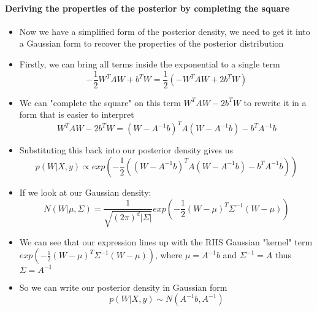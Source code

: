 \documentclass[12pt]{article}
\begin{document}
\paragraph{Deriving the properties of the posterior by completing the square}
\begin{itemize}
     \item Now we have a simplified form of the posterior density, we need to get it into a Gaussian form to recover the properties of the posterior distribution
    \item Firstly, we can bring all terms inside the exponential to a single term
\begin{equation}
    -\frac{1}{2}W^TAW + b^TW = \frac{1}{2}\left(-W^TAW + 2b^TW\right)
\end{equation}
    \item We can "complete the square" on this term $W^TAW - 2b^TW$ to rewrite it in a form that is easier to interpret
\begin{equation}
    W^TAW - 2b^TW = (W - A^{-1}b)^TA(W - A^{-1}b) - b^TA^{-1}b
\end{equation}
    \item Substituting this back into our posterior density gives us
\begin{equation}
    p(W|X,y) \propto exp\left(-\frac{1}{2}\left((W - A^{-1}b)^TA(W - A^{-1}b) - b^TA^{-1}b\right)\right)
\end{equation}
    \item If we look at our Gaussian density: 
\begin{equation}
    N(W | \mu, \Sigma) = \frac{1}{\sqrt{(2\pi)^d |\Sigma|}} exp\left(-\frac{1}{2}(W - \mu)^T\Sigma^{-1}(W - \mu)\right)
\end{equation}
    \item We can see that our expression lines up with the RHS Gaussian "kernel" term $exp\left(-\frac{1}{2}(W - \mu)^T\Sigma^{-1}(W - \mu)\right)$, where $\mu = A^{-1}b$ and $\Sigma^{-1} = A$ thus $\Sigma = A^{-1}$
    \item So we can write our posterior density in Gaussian form
\begin{equation}
    p(W|X,y) \sim N(A^{-1}b, A^{-1})
\end{equation}
\end{itemize}
\end{document}
